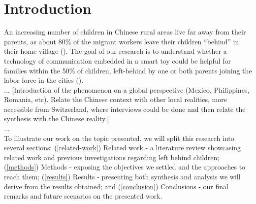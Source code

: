 \section{Introduction}


An increasing number of children in Chinese rural areas live far away from their parents, as about 80\% of the migrant workers leave their children “behind” in their home-village (\cite{guo2017effect}). The goal of our research is to understand whether a technology of communication embedded in a smart toy could be helpful for families within the 50\% of children, left-behind by one or both parents joining the labor force in the cities (\cite{bai2017effect}).\\
...
[Introduction of the phenomenon on a global perspective (Mexico, Philippines, Romania, etc). Relate the Chinese context with other local realities, more accessible from Switzerland, where interviews could be done and then relate the synthesis with the Chinese reality.]\\
...\\


To illustrate our work on the topic presented, we will split this research into several sections: (\ref{related-work}) Related work - a literature review showcasing related work and previous investigations regarding left behind children; (\ref{methods}) Methods - exposing the objectives we settled and the approaches to reach them; (\ref{results}) Results - presenting both synthesis and analysis we will derive from the results obtained; and (\ref{conclusion}) Conclusions - our final remarks and future scenarios on the presented work.

